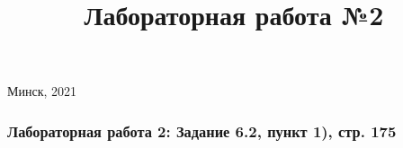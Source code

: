 \documentclass[11pt]{article}
\title{Лабораторная работа №2}
\begin{document}
    
    
        \begin{titlepage}
    	\begin{center}
    		\fontsize{12pt}{12pt}
    	\end{center}
    	\vspace*{\fill}
    	\fontsize{14pt}{14pt}
    	\vspace*{\fill}
    	\begin{center}
    		\fontsize{14pt}{14pt}\selectfont
    		Минск, 2021
    	\end{center}
    \end{titlepage}
    \setcounter{page}{2}
    
    

    
    \hypertarget{ux43bux430ux431ux43eux440ux430ux442ux43eux440ux43dux430ux44f-ux440ux430ux431ux43eux442ux430-2-ux437ux430ux434ux430ux43dux438ux435-6.2-ux43fux443ux43dux43aux442-1-ux441ux442ux440.-175}{%
\subsubsection{Лабораторная работа 2: Задание 6.2, пункт 1), стр.
175}\label{ux43bux430ux431ux43eux440ux430ux442ux43eux440ux43dux430ux44f-ux440ux430ux431ux43eux442ux430-2-ux437ux430ux434ux430ux43dux438ux435-6.2-ux43fux443ux43dux43aux442-1-ux441ux442ux440.-175}}
\end{document}
